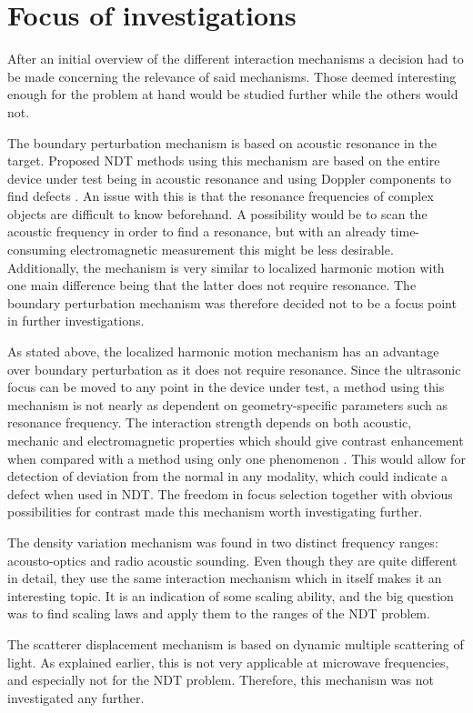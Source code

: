 \documentclass[10pt,a4paper,draft]{scrartcl}
\begin{document}
	\section{Focus of investigations}
	After an initial overview of the different interaction mechanisms a decision had to be made concerning the relevance of said mechanisms. Those deemed interesting enough for the problem at hand would be studied further while the others would not.
	
	The boundary perturbation mechanism is based on acoustic resonance in the target. Proposed NDT methods using this mechanism are based on the entire device under test being in acoustic resonance and using Doppler components to find defects \cite{Buerkle2009}. An issue with this is that the resonance frequencies of complex objects are difficult to know beforehand. A possibility would be to scan the acoustic frequency in order to find a resonance, but with an already time-consuming electromagnetic measurement this might be less desirable. Additionally, the mechanism is very similar to localized harmonic motion with one main difference being that the latter does not require resonance. The boundary perturbation mechanism was therefore decided not to be a focus point in further investigations.
	
	As stated above, the localized harmonic motion mechanism has an advantage over boundary perturbation as it does not require resonance. Since the ultrasonic focus can be moved to any point in the device under test, a method using this mechanism is not nearly as dependent on geometry-specific parameters such as resonance frequency. The interaction strength depends on both acoustic, mechanic and electromagnetic properties which should give contrast enhancement when compared with a method using only one phenomenon \cite{Top2016}. This would allow for detection of deviation from the normal in any modality, which could indicate a defect when used in NDT. The freedom in focus selection together with obvious possibilities for contrast made this mechanism worth investigating further.
	
	The density variation mechanism was found in two distinct frequency ranges: acousto-optics and radio acoustic sounding. Even though they are quite different in detail, they use the same interaction mechanism which in itself makes it an interesting topic. It is an indication of some scaling ability, and the big question was to find scaling laws and apply them to the ranges of the NDT problem.
	
	The scatterer displacement mechanism is based on dynamic multiple scattering of light. As explained earlier, this is not very applicable at microwave frequencies, and especially not for the NDT problem. Therefore, this mechanism was not investigated any further.
	
\end{document}
